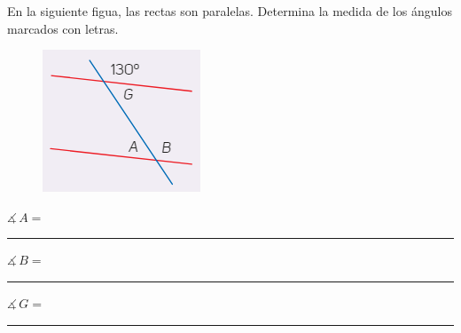 En la siguiente figua, las rectas son paralelas. Determina la medida de los ángulos marcados con letras.
\begin{figure}[H]
    \centering
    \includegraphics[scale=1.25]{Imagenes/Angulos_05.png}
\end{figure}
$\measuredangle \, A =$ \rule{2cm}{0.1mm} \hspace{0.4cm} $\measuredangle \, B =$ \rule{2cm}{0.1mm} \hspace{0.4cm} $\measuredangle \, G =$ \rule{2cm}{0.1mm}
